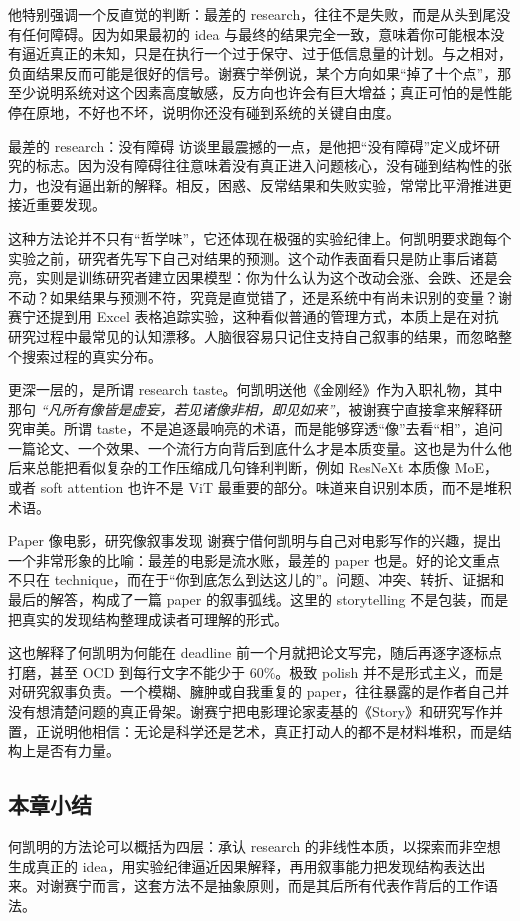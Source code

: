 他特别强调一个反直觉的判断：最差的 research，往往不是失败，而是从头到尾没有任何障碍。因为如果最初的 idea 与最终的结果完全一致，意味着你可能根本没有逼近真正的未知，只是在执行一个过于保守、过于低信息量的计划。与之相对，负面结果反而可能是很好的信号。谢赛宁举例说，某个方向如果“掉了十个点”，那至少说明系统对这个因素高度敏感，反方向也许会有巨大增益；真正可怕的是性能停在原地，不好也不坏，说明你还没有碰到系统的关键自由度。

\begin{warningbox}{最差的 research：没有障碍}
访谈里最震撼的一点，是他把“没有障碍”定义成坏研究的标志。因为没有障碍往往意味着没有真正进入问题核心，没有碰到结构性的张力，也没有逼出新的解释。相反，困惑、反常结果和失败实验，常常比平滑推进更接近重要发现。
\end{warningbox}

这种方法论并不只有“哲学味”，它还体现在极强的实验纪律上。何凯明要求跑每个实验之前，研究者先写下自己对结果的预测。这个动作表面看只是防止事后诸葛亮，实则是训练研究者建立因果模型：你为什么认为这个改动会涨、会跌、还是会不动？如果结果与预测不符，究竟是直觉错了，还是系统中有尚未识别的变量？谢赛宁还提到用 Excel 表格追踪实验，这种看似普通的管理方式，本质上是在对抗研究过程中最常见的认知漂移。人脑很容易只记住支持自己叙事的结果，而忽略整个搜索过程的真实分布。

更深一层的，是所谓 research taste。何凯明送他《金刚经》作为入职礼物，其中那句 \textit{``凡所有像皆是虚妄，若见诸像非相，即见如来''}，被谢赛宁直接拿来解释研究审美。所谓 taste，不是追逐最响亮的术语，而是能够穿透“像”去看“相”，追问一篇论文、一个效果、一个流行方向背后到底什么才是本质变量。这也是为什么他后来总能把看似复杂的工作压缩成几句锋利判断，例如 ResNeXt 本质像 MoE，或者 soft attention 也许不是 ViT 最重要的部分。味道来自识别本质，而不是堆积术语。

\begin{importantbox}{Paper 像电影，研究像叙事发现}
谢赛宁借何凯明与自己对电影写作的兴趣，提出一个非常形象的比喻：最差的电影是流水账，最差的 paper 也是。好的论文重点不只在 technique，而在于“你到底怎么到达这儿的”。问题、冲突、转折、证据和最后的解答，构成了一篇 paper 的叙事弧线。这里的 storytelling 不是包装，而是把真实的发现结构整理成读者可理解的形式。
\end{importantbox}

这也解释了何凯明为何能在 deadline 前一个月就把论文写完，随后再逐字逐标点打磨，甚至 OCD 到每行文字不能少于 60\%。极致 polish 并不是形式主义，而是对研究叙事负责。一个模糊、臃肿或自我重复的 paper，往往暴露的是作者自己并没有想清楚问题的真正骨架。谢赛宁把电影理论家麦基的《Story》和研究写作并置，正说明他相信：无论是科学还是艺术，真正打动人的都不是材料堆积，而是结构上是否有力量。

\subsection{本章小结}

何凯明的方法论可以概括为四层：承认 research 的非线性本质，以探索而非空想生成真正的 idea，用实验纪律逼近因果解释，再用叙事能力把发现结构表达出来。对谢赛宁而言，这套方法不是抽象原则，而是其后所有代表作背后的工作语法。

